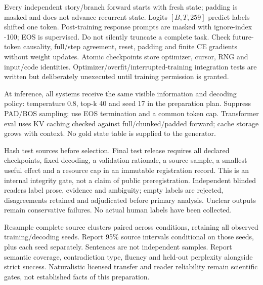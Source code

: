 Every independent story/branch forward starts with fresh state; padding is masked
and does not advance recurrent state. Logits \([B,T,259]\) predict labels shifted
one token. Post-training response prompts are masked with ignore-index -100;
EOS is supervised. Do not silently truncate a complete task. Check future-token
causality, full/step agreement, reset, padding and finite CE gradients without
weight updates. Atomic checkpoints store optimizer, cursor, RNG and input/code
identities. Optimizer/overfit/interrupted-training integration tests are written
but deliberately unexecuted until training permission is granted.

At inference, all systems receive the same visible information and decoding
policy: temperature 0.8, top-k 40 and seed 17 in the preparation plan. Suppress
PAD/BOS sampling; use EOS termination and a common token cap. Transformer eval
uses KV caching checked against full/chunked/padded forward; cache storage grows
with context. No gold state table is supplied to the generator.

Hash test sources before selection. Final test release requires all declared
checkpoints, fixed decoding, a validation rationale, a source sample, a smallest
useful effect and a resource cap in an immutable registration record. This is
an internal integrity gate, not a claim of public preregistration. Independent
blinded readers label prose, evidence and ambiguity; empty labels are rejected,
disagreements retained and adjudicated before primary analysis. Unclear outputs
remain conservative failures. No actual human labels have been collected.

Resample complete source clusters paired across conditions, retaining all
observed training/decoding seeds. Report 95\% source intervals conditional on
those seeds, plus each seed separately. Sentences are not independent samples.
Report semantic coverage, contradiction type, fluency and held-out perplexity
alongside strict success. Naturalistic licensed transfer and reader reliability
remain scientific gates, not established facts of this preparation.
